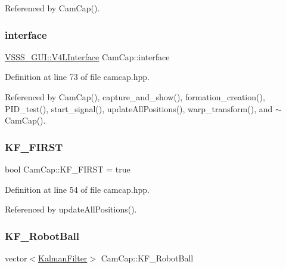 Referenced by Cam\+Cap().

\mbox{\label{class_cam_cap_a58002893dfb61307042ddbba0c362dcd}} 
\subsubsection{\texorpdfstring{interface}{interface}}
{\footnotesize\ttfamily \hyperlink{class_v_s_s_s___g_u_i_1_1_v4_l_interface}{V\+S\+S\+S\+\_\+\+G\+U\+I\+::\+V4\+L\+Interface} Cam\+Cap\+::interface}



Definition at line 73 of file camcap.\+hpp.



Referenced by Cam\+Cap(), capture\+\_\+and\+\_\+show(), formation\+\_\+creation(), P\+I\+D\+\_\+test(), start\+\_\+signal(), update\+All\+Positions(), warp\+\_\+transform(), and $\sim$\+Cam\+Cap().

\mbox{\label{class_cam_cap_ada660167ec9872e8c91f0e8cf82028f0}} 
\subsubsection{\texorpdfstring{K\+F\+\_\+\+F\+I\+R\+ST}{KF\_FIRST}}
{\footnotesize\ttfamily bool Cam\+Cap\+::\+K\+F\+\_\+\+F\+I\+R\+ST = true}



Definition at line 54 of file camcap.\+hpp.



Referenced by update\+All\+Positions().

\mbox{\label{class_cam_cap_abf236d376a111567379a41ae29b3f644}} 
\subsubsection{\texorpdfstring{K\+F\+\_\+\+Robot\+Ball}{KF\_RobotBall}}
{\footnotesize\ttfamily vector$<$\hyperlink{class_kalman_filter}{Kalman\+Filter}$>$ Cam\+Cap\+::\+K\+F\+\_\+\+Robot\+Ball}



